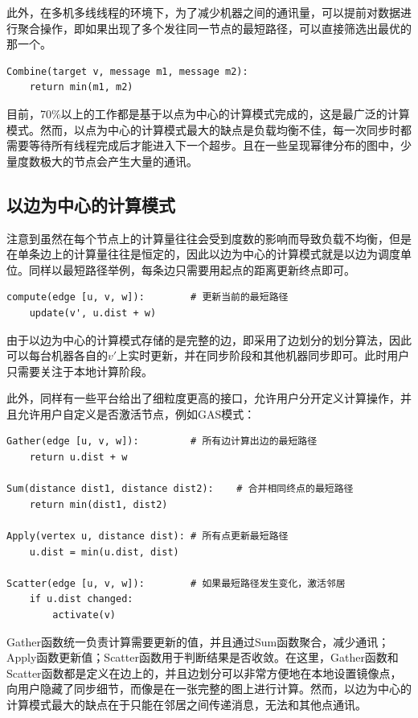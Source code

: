 此外，在多机多线线程的环境下，为了减少机器之间的通讯量，可以提前对数据进行聚合操作，即如果出现了多个发往同一节点的最短路径，可以直接筛选出最优的那一个。
\begin{lstlisting}
Combine(target v, message m1, message m2):
    return min(m1, m2)
\end{lstlisting}

目前，70\%以上的工作都是基于以点为中心的计算模式完成的，这是最广泛的计算模式。然而，以点为中心的计算模式最大的缺点是负载均衡不佳，每一次同步时都需要等待所有线程完成后才能进入下一个超步。且在一些呈现幂律分布的图中，少量度数极大的节点会产生大量的通讯。

\subsection{以边为中心的计算模式}

注意到虽然在每个节点上的计算量往往会受到度数的影响而导致负载不均衡，但是在单条边上的计算量往往是恒定的，因此以边为中心的计算模式就是以边为调度单位。同样以最短路径举例，每条边只需要用起点的距离更新终点即可。
\begin{lstlisting}
compute(edge [u, v, w]):        # 更新当前的最短路径
    update(v', u.dist + w)          
\end{lstlisting}
由于以边为中心的计算模式存储的是完整的边，即采用了边划分的划分算法，因此可以每台机器各自的$v'$上实时更新，并在同步阶段和其他机器同步即可。此时用户只需要关注于本地计算阶段。

此外，同样有一些平台给出了细粒度更高的接口，允许用户分开定义计算操作，并且允许用户自定义是否激活节点，例如GAS模式：
\begin{lstlisting}
Gather(edge [u, v, w]):         # 所有边计算出边的最短路径
    return u.dist + w

Sum(distance dist1, distance dist2):    # 合并相同终点的最短路径
    return min(dist1, dist2)

Apply(vertex u, distance dist): # 所有点更新最短路径
    u.dist = min(u.dist, dist)

Scatter(edge [u, v, w]):        # 如果最短路径发生变化，激活邻居
    if u.dist changed:
        activate(v)
\end{lstlisting}
Gather函数统一负责计算需要更新的值，并且通过Sum函数聚合，减少通讯；Apply函数更新值；Scatter函数用于判断结果是否收敛。在这里，Gather函数和Scatter函数都是定义在边上的，并且边划分可以非常方便地在本地设置镜像点，向用户隐藏了同步细节，而像是在一张完整的图上进行计算。然而，以边为中心的计算模式最大的缺点在于只能在邻居之间传递消息，无法和其他点通讯。

